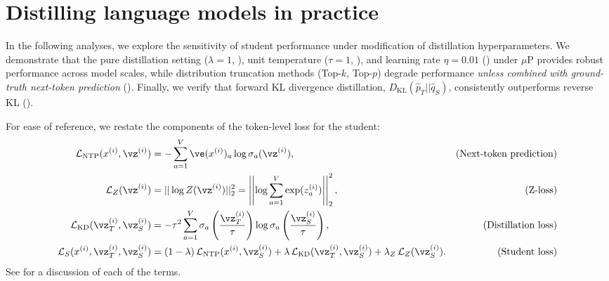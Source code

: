 \FloatBarrier
\section{Distilling language models in practice}
\label{sec:distilling-language-models-in-practice}

In the following analyses, we explore the sensitivity of student performance under modification of distillation hyperparameters.
We demonstrate that the pure distillation setting 
($\lambda=1$, ), 
unit temperature ($\tau=1$, ), 
and learning rate $\eta=0.01$ () under 
$\mu$P \citep{DBLP:conf/icml/YangH21,DBLP:journals/corr/abs-2308-01814,DBLP:journals/corr/abs-2203-03466,DBLP:journals/corr/abs-2309-14322,DBLP:journals/corr/abs-2310-17813} provides robust performance across model scales, while distribution truncation methods (Top-$k$, Top-$p$) degrade performance \emph{unless combined with ground-truth next-token prediction} (). 
Finally, we verify that forward KL divergence distillation, $D_{\text{KL}}(\hat{p}_T || \hat{q}_S)$, consistently outperforms reverse KL ().

For ease of reference, we restate the components of the token-level loss for the student:
\begin{align}
	\Ls_{\text{NTP}}(x^{(i)},\vz^{(i)}) & =
	-\sum_{a=1}^V \ve(x^{(i)})_a\log \sigma_a(\vz^{(i)}),
	\label{eq:ntp-cross-entropy-app} & \textrm{(Next-token prediction)}\\
        \Ls_Z(\vz^{(i)})
        &=||\log Z(\vz^{(i)})||_2^2
        =\left|\left|\log \sum_{a=1}^V\exp(z_a^{(i)})\right|\right|_2^2   , & \textrm{(Z-loss)}\\
        \Ls_{\text{KD}}(\vz_T^{(i)},\vz_S^{(i)}) & =
        -\tau^2
        \sum_{a=1}^V \sigma_a
        \left(\frac{\vz_T^{(i)}}{\tau}\right)
        \log \sigma_a\left(\frac{\vz_S^{(i)}}{\tau}\right),  & \textrm{(Distillation loss)} \label{eq:distillation-loss-app}\\
        \Ls_{S}  (x^{(i)},\vz_T^{(i)},\vz_S^{(i)})&=
        (1-\lambda)\,\Ls_{\text{NTP}}(x^{(i)},\vz_S^{(i)})+\lambda\,\Ls_{\text{KD}}(\vz_T^{(i)},\vz_S^{(i)}) +\lambda_Z\,\Ls_{Z}(\vz_S^{(i)}). & \textrm{(Student loss)}
                                           \label{eqn:kd_and_nll_full_loss_app}        
\end{align}
See  for a discussion of each of the terms.


